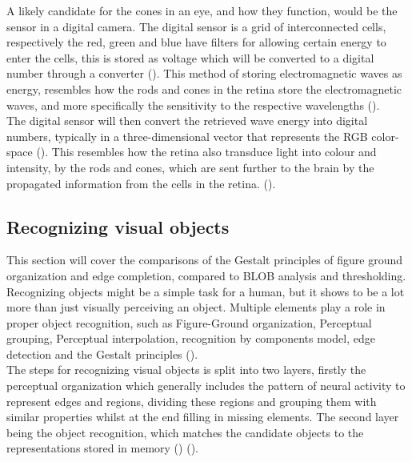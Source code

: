 \documentclass{article}
\newcommand{\goodcite}[1]{ {(\cite{#1})}}
\begin{document}
A likely candidate for the cones in an eye, and how they function, would be the sensor in a digital camera. The digital sensor is a grid of interconnected cells, respectively the red, green and blue have filters for allowing certain energy to enter the cells, this is stored as voltage which will be converted to a digital number through a converter\goodcite{IP}. This method of storing electromagnetic waves as energy, resembles how the rods and cones in the retina store the electromagnetic waves, and more specifically the sensitivity to the respective wavelengths\goodcite{hsp}.\\The digital sensor will then convert the retrieved wave energy into digital numbers, typically in a three-dimensional vector that represents the RGB color-space\goodcite{IP}. This resembles how the retina also transduce light into colour and intensity, by the rods and cones, which are sent further to the brain by the propagated information from the cells in the retina.\goodcite{hsp}.


\subsection{Recognizing visual objects}%
This section will cover the comparisons of the Gestalt principles of figure ground organization and edge completion, compared to BLOB analysis and thresholding.\medskip\\

Recognizing objects might be a simple task for a human, but it shows to be a lot more than just visually perceiving an object. Multiple elements play a role in proper object recognition, such as Figure-Ground organization, Perceptual grouping, Perceptual interpolation, recognition by components model, edge detection and the Gestalt principles\goodcite{hsp}.\\
The steps for recognizing visual objects is split into two layers, firstly the perceptual organization which generally includes the pattern of neural activity to represent edges and regions, dividing these regions and grouping them with similar properties whilst at the end filling in missing elements. The second layer being the object recognition, which matches the candidate objects to the representations stored in memory\goodcite{hsp}\goodcite{bieder}.
\end{document}
